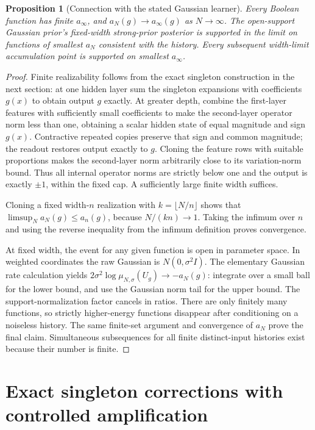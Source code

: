 \documentclass[11pt]{article}
\newtheorem{proposition}[theorem]{Proposition}
\theoremstyle{remark}\newtheorem{remark}[theorem]{Remark}
\begin{document}
\begin{proposition}[Connection with the stated Gaussian learner]
\label{prop:limits}
Every Boolean function has finite $a_\infty$, and
$a_N(g)\to a_\infty(g)$ as $N\to\infty$. The open-support Gaussian
prior's fixed-width strong-prior posterior is supported in the limit on
functions of smallest $a_N$ consistent with the history. Every subsequent
width-limit accumulation point is supported on smallest $a_\infty$.
\end{proposition}
\begin{proof}
Finite realizability follows from the exact singleton construction in the
next section: at one hidden layer sum the singleton expansions with
coefficients $g(x)$ to obtain output $g$ exactly. At greater depth,
combine the first-layer features with sufficiently small coefficients to
make the second-layer operator norm less than one, obtaining a scalar
hidden state of equal magnitude and sign $g(x)$. Contractive repeated
copies preserve that sign and common magnitude; the readout restores
output exactly to $g$. Cloning the feature rows with suitable proportions
makes the second-layer norm arbitrarily close to its variation-norm bound.
Thus all internal operator norms are strictly below one and the output
is exactly $\pm1$, within the fixed cap. A sufficiently large finite
width suffices.

Cloning a fixed width-$n$ realization with $k=\lfloor N/n\rfloor$
shows that $\limsup_N a_N(g)\le a_n(g)$, because
$N/(kn)\to1$. Taking the infimum over $n$ and using the reverse
inequality from the infimum definition proves convergence.

At fixed width, the event for any given function is open in parameter
space. In weighted coordinates the raw Gaussian is $N(0,\sigma^2I)$.
The elementary Gaussian rate calculation yields
$2\sigma^2\log\mu_{N,\sigma}(U_g)\to-a_N(g)$: integrate over a
small ball for the lower bound, and use the Gaussian norm tail for the
upper bound. The support-normalization factor cancels in ratios.
There are only finitely many functions, so strictly higher-energy
functions disappear after conditioning on a noiseless history.
The same finite-set argument and convergence of $a_N$ prove the final
claim. Simultaneous subsequences for all finite distinct-input histories
exist because their number is finite.
\end{proof}

\section{Exact singleton corrections with controlled amplification}
\end{document}
